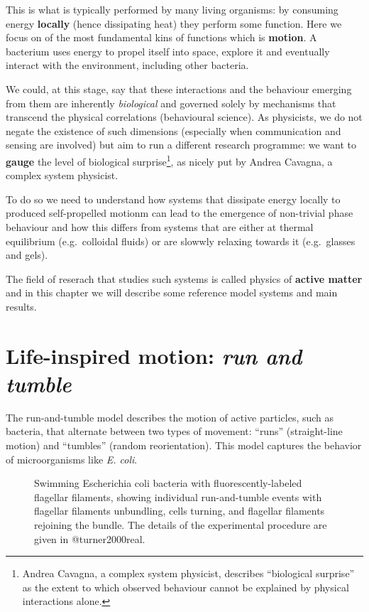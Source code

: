 \documentclass[
  letterpaper,
  enabledeprecatedfontcommands]{report}
\begin{document}
This is what is typically performed by many living organisms: by
consuming energy \textbf{locally} (hence dissipating heat) they perform
some function. Here we focus on of the most fundamental kins of
functions which is \textbf{motion}. A bacterium uses energy to propel
itself into space, explore it and eventually interact with the
environment, including other bacteria.

We could, at this stage, say that these interactions and the behaviour
emerging from them are inherently \emph{biological} and governed solely
by mechanisms that transcend the physical correlations (behavioural
science). As physicists, we do not negate the existence of such
dimensions (especially when communication and sensing are involved) but
aim to run a different research programme: we want to \textbf{gauge} the
level of biological surprise\footnote{Andrea Cavagna, a complex system
  physicist, describes ``biological surprise'' as the extent to which
  observed behaviour cannot be explained by physical interactions alone.},
as nicely put by Andrea Cavagna, a complex system physicist.

To do so we need to understand how systems that dissipate energy locally
to produced self-propelled motionm can lead to the emergence of
non-trivial phase behaviour and how this differs from systems that are
either at thermal equilibrium (e.g.~colloidal fluids) or are slowwly
relaxing towards it (e.g.~glasses and gels).

The field of reserach that studies such systems is called physics of
\textbf{active matter} and in this chapter we will describe some
reference model systems and main results.

\section{\texorpdfstring{Life-inspired motion: \emph{run and
tumble}}{Life-inspired motion: run and tumble}}\label{life-inspired-motion-run-and-tumble}

The run-and-tumble model describes the motion of active particles, such
as bacteria, that alternate between two types of movement: ``runs''
(straight-line motion) and ``tumbles'' (random reorientation). This
model captures the behavior of microorganisms like \emph{E. coli}.

\begin{figure}


\caption{\label{fig-escherichia}Swimming Escherichia coli bacteria with
fluorescently-labeled flagellar filaments, showing individual
run-and-tumble events with flagellar filaments unbundling, cells
turning, and flagellar filaments rejoining the bundle. The details of
the experimental procedure are given in @turner2000real.}

\end{figure}%
\end{document}
